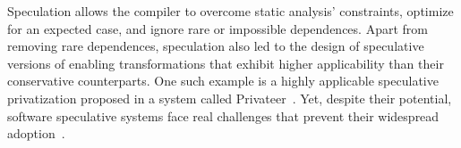 %
%

Speculation allows the compiler to overcome static analysis'
constraints, optimize for an expected
case, and ignore rare or impossible dependences.
%
%
Apart from removing rare dependences, speculation also led to the
design of speculative versions of enabling transformations that
exhibit higher applicability than their conservative counterparts.
One such example is a highly applicable speculative privatization
proposed in a system called Privateer~\cite{johnson:12:pldi}.
%
%
%
%
Yet, despite their potential, software speculative systems face real
challenges that prevent their widespread
adoption~\cite{cascaval:08:stmtoy:short, .., ..}.
%

